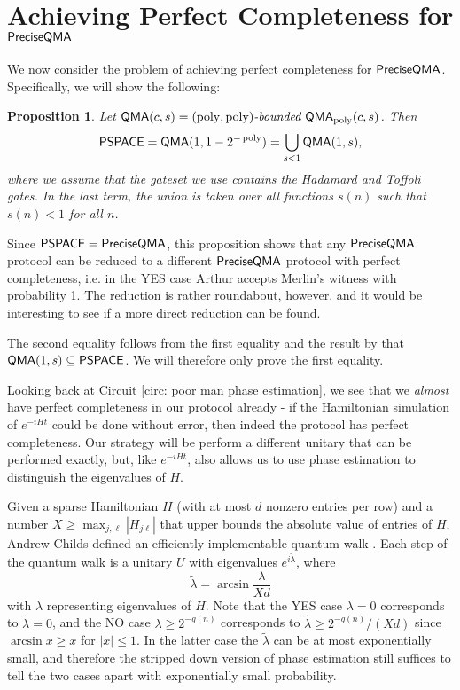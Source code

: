 \documentclass[a4paper,UKenglish]{lipics-v2016}
\newtheorem{proposition}[theorem]{Proposition}
\newcommand\QMA{{\sf{QMA}}}
\newcommand\PSPACE{{\sf{PSPACE}}}
\newcommand\preciseQMA{{\sf{PreciseQMA}}}
\newcommand\bddQMA[5]{{\left(#1,#2\right)}\textit{-bounded }\QMA_{#3}(#4,#5)}
\DeclareMathOperator{\poly}{poly}
\begin{document}
\section{Achieving Perfect Completeness for $\preciseQMA$}\label{app:perfectcompleteness}
We now consider the problem of achieving perfect completeness for $\preciseQMA$. Specifically, we will show the following:
\begingroup
\def\theproposition{\ref{prop: perfect completeness}}
\begin{proposition} Let $\QMA(c,s) = \bddQMA{\poly}{\poly}{\poly}{c}{s}$. Then
\[
\PSPACE = \QMA(1,1-2^{-\poly}) = \bigcup_{s < 1}\QMA(1,s),
\]
where we assume that the gateset we use contains the Hadamard and Toffoli gates. In the last term, the union is taken over all functions $s(n)$ such that $s(n) < 1$ for all $n$.
\end{proposition}
\addtocounter{theorem}{-1}
\endgroup


Since $\PSPACE = \preciseQMA$, this proposition shows that any $\preciseQMA$ protocol can be reduced to a different $\preciseQMA$ protocol with perfect completeness, i.e. in the YES case Arthur accepts Merlin's witness with probability 1. The reduction is rather roundabout, however, and it would be interesting to see if a more direct reduction can be found.

The second equality follows from the first equality and the result by \cite{ikw12} that $\QMA(1,s) \subseteq \PSPACE$. We will therefore only prove the first equality.

Looking back at Circuit \ref{circ: poor man phase estimation}, we see that we \emph{almost} have perfect completeness in our protocol already - if the Hamiltonian simulation of $e^{-iHt}$ could be done without error, then indeed the protocol has perfect completeness. Our strategy will be perform a different unitary that can be performed exactly, but, like $e^{-iHt}$, also allows us to use phase estimation to distinguish the eigenvalues of $H$.

Given a sparse Hamiltonian $H$ (with at most $d$ nonzero entries per row) and a number $X \ge \max_{j,\ell}|H_{j\ell}|$ that upper bounds the absolute value of entries of $H$, Andrew Childs defined an efficiently implementable quantum walk \cite{berry14,childs10}. Each step of the quantum walk is a unitary $U$ with eigenvalues $e^{i\tilde{\lambda}}$, where 
\begin{equation}
\tilde{\lambda} = \arcsin \frac{\lambda}{Xd}
\end{equation}
with $\lambda$ representing eigenvalues of $H$. Note that the YES case $\lambda = 0$ corresponds to $\tilde{\lambda}=0$, and the NO case $\lambda \ge 2^{-g(n)}$ corresponds to $\tilde{\lambda} \ge 2^{-g(n)}/(Xd)$ since $\arcsin x \ge x$ for $|x| \le 1$. In the latter case the $\tilde{\lambda}$ can be at most exponentially small, and therefore the stripped down version of phase estimation still suffices to tell the two cases apart with exponentially small probability.
\end{document}
